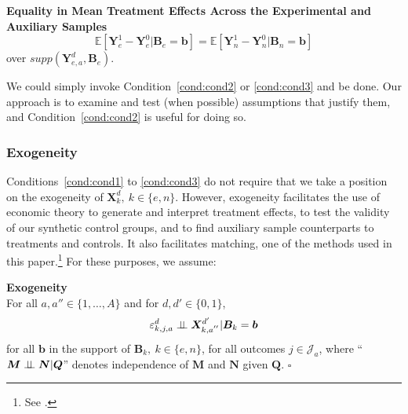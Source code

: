 \onehalfspacing
\begin{condition} \textbf{Equality in Mean Treatment Effects Across the Experimental and Auxiliary Samples \label{cond:cond3}}
\begin{equation}
\mathbb{E} \left[ \bm{Y}_e^1 - \bm{Y}_e^0 | \bm{B}_e = \bm{b} \right] = \mathbb{E} \left[ \bm{Y}_n^1 - \bm{Y}_n^0 | \bm{B}_n = \bm{b} \right]
\end{equation}
over $supp\left(\bm{Y}^d_{e,a}, \bm{B}_e\right)$.\footnotemark
\end{condition}
\doublespacing
We could simply invoke Condition~\ref{cond:cond2} or \ref{cond:cond3} and be done. Our approach is to examine and test (when possible) assumptions that justify them, and Condition~\ref{cond:cond2} is useful for doing so.

\subsubsection{Exogeneity}

Conditions~\ref{cond:cond1} to \ref{cond:cond3} do not require that we take a position on the exogeneity of $\bm{X}^d_k, \: k \in \{e,n\}$. However, exogeneity facilitates the use of economic theory to generate and interpret treatment effects, to test the validity of our synthetic control groups, and to find auxiliary sample counterparts to treatments and controls. It also facilitates matching, one of the methods used in this paper.\footnote{See \cite{Heckman_Navarro_2004_REStat}.} For these purposes, we assume:

\onehalfspacing
\begin{assumption}\label{ass:exog} \textbf{Exogeneity}\\
For all $a, a'' \in \{ 1, \ldots, A \}$ and for $d, d' \in \{0,1\}$,
\begin{equation}
\varepsilon^d_{k,j,a} \perp\!\!\!\perp \bm{X}^{d^{\prime}}_{k,a^{''}} | \bm{B}_k = \bm{b}
\end{equation}
for all $\bm{b}$ in the support of $\bm{B}_k, \: k \in \{e,n\}$, for all outcomes $j \in \mathcal{J}_{a}$, where ``$\bm{M} \perp\!\!\!\perp \bm{N}|\bm{Q}$'' denotes independence of $\bm{M}$ and $\bm{N}$ given $\bm{Q}$. $\square$
\end{assumption}
\doublespacing

